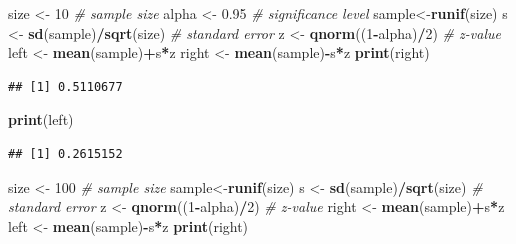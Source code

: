 \documentclass[
]{book}
\newenvironment{Shaded}{\begin{snugshade}}{\end{snugshade}}
\newcommand{\CommentTok}[1]{\textcolor[rgb]{0.56,0.35,0.01}{\textit{#1}}}
\newcommand{\DecValTok}[1]{\textcolor[rgb]{0.00,0.00,0.81}{#1}}
\newcommand{\FloatTok}[1]{\textcolor[rgb]{0.00,0.00,0.81}{#1}}
\newcommand{\KeywordTok}[1]{\textcolor[rgb]{0.13,0.29,0.53}{\textbf{#1}}}
\newcommand{\NormalTok}[1]{#1}
\newcommand{\OperatorTok}[1]{\textcolor[rgb]{0.81,0.36,0.00}{\textbf{#1}}}
\newcommand{\StringTok}[1]{\textcolor[rgb]{0.31,0.60,0.02}{#1}}
\theoremstyle{definition}
\theoremstyle{definition}
\theoremstyle{definition}
\theoremstyle{remark}
\begin{document}
\begin{Shaded}
\begin{Highlighting}[]
\NormalTok{size \textless{}{-}}\StringTok{ }\DecValTok{10} \CommentTok{\# sample size}
\NormalTok{alpha \textless{}{-}}\StringTok{ }\FloatTok{0.95} \CommentTok{\# significance level}
\NormalTok{sample\textless{}{-}}\KeywordTok{runif}\NormalTok{(size)}
\NormalTok{s \textless{}{-}}\StringTok{ }\KeywordTok{sd}\NormalTok{(sample)}\OperatorTok{/}\KeywordTok{sqrt}\NormalTok{(size) }\CommentTok{\# standard error}
\NormalTok{z \textless{}{-}}\StringTok{ }\KeywordTok{qnorm}\NormalTok{((}\DecValTok{1}\OperatorTok{{-}}\NormalTok{alpha)}\OperatorTok{/}\DecValTok{2}\NormalTok{) }\CommentTok{\# z{-}value}
\NormalTok{left \textless{}{-}}\StringTok{ }\KeywordTok{mean}\NormalTok{(sample)}\OperatorTok{+}\NormalTok{s}\OperatorTok{*}\NormalTok{z}
\NormalTok{right \textless{}{-}}\StringTok{ }\KeywordTok{mean}\NormalTok{(sample)}\OperatorTok{{-}}\NormalTok{s}\OperatorTok{*}\NormalTok{z}
\KeywordTok{print}\NormalTok{(right)}
\end{Highlighting}
\end{Shaded}

\begin{verbatim}
## [1] 0.5110677
\end{verbatim}

\begin{Shaded}
\begin{Highlighting}[]
\KeywordTok{print}\NormalTok{(left)}
\end{Highlighting}
\end{Shaded}

\begin{verbatim}
## [1] 0.2615152
\end{verbatim}

\begin{Shaded}
\begin{Highlighting}[]
\NormalTok{size \textless{}{-}}\StringTok{ }\DecValTok{100} \CommentTok{\# sample size}
\NormalTok{sample\textless{}{-}}\KeywordTok{runif}\NormalTok{(size)}
\NormalTok{s \textless{}{-}}\StringTok{ }\KeywordTok{sd}\NormalTok{(sample)}\OperatorTok{/}\KeywordTok{sqrt}\NormalTok{(size) }\CommentTok{\# standard error}
\NormalTok{z \textless{}{-}}\StringTok{ }\KeywordTok{qnorm}\NormalTok{((}\DecValTok{1}\OperatorTok{{-}}\NormalTok{alpha)}\OperatorTok{/}\DecValTok{2}\NormalTok{) }\CommentTok{\# z{-}value}
\NormalTok{right \textless{}{-}}\StringTok{ }\KeywordTok{mean}\NormalTok{(sample)}\OperatorTok{+}\NormalTok{s}\OperatorTok{*}\NormalTok{z}
\NormalTok{left \textless{}{-}}\StringTok{ }\KeywordTok{mean}\NormalTok{(sample)}\OperatorTok{{-}}\NormalTok{s}\OperatorTok{*}\NormalTok{z}
\KeywordTok{print}\NormalTok{(right)}
\end{Highlighting}
\end{Shaded}
\end{document}
